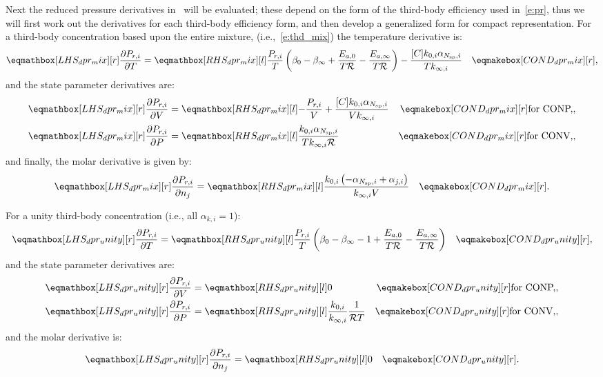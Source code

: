 \documentclass[12pt,number,sort&compress]{elsarticle}
\begin{document}
Next the reduced pressure derivatives in~ will be evaluated; these depend on the form of the third-body efficiency used in~\cref{e:pr}, thus we will first work out the derivatives for each third-body efficiency form, and then develop a generalized form for compact representation.
For a third-body concentration based upon the entire mixture, (i.e.,~\cref{e:thd_mix}) the temperature derivative is:
\begin{align}
 \lhs{dpr_mix}{\frac{\partial P_{r, i} }{\partial T }} &= \rhs{dpr_mix}{\frac{P_{r, i}}{T} \left(\beta_{0} - \beta_{\infty} + \frac{E_{a, 0}}{T \Ru/} - \frac{E_{a, \infty}}{T \Ru/}\right) - \frac{[C] k_{0, i} \alpha_{\ns/,i}}{T k_{\infty, i}}} & \cond{dpr_mix}{,} \label{e:dpr_mix_dt}
\end{align}
and the state parameter derivatives are:
\begin{subequations}
 \label{e:dpr_mix_de}
 \begin{align}
  \lhs{dpr_mix}{\frac{\partial P_{r, i} }{\partial V }} &= \rhs{dpr_mix}{- \frac{P_{r, i}}{V} + \frac{[C] k_{0, i} \alpha_{\ns/,i}}{V k_{\infty, i}}} & \cond{dpr_mix}{\dconp/,} \\
  \lhs{dpr_mix}{\frac{\partial P_{r, i} }{\partial P }} &= \rhs{dpr_mix}{\frac{k_{0, i} \alpha_{\ns/,i}}{T k_{\infty, i} \Ru/}} & \cond{dpr_mix}{\dconv/,}
 \end{align}
\end{subequations}
and finally, the molar derivative is given by:
\begin{align}
 \lhs{dpr_mix}{\frac{\partial P_{r, i} }{\partial n_j }} &= \rhs{dpr_mix}{\frac{k_{0, i} \left(- \alpha_{\ns/,i} + \alpha_{j,i}\right)}{k_{\infty, i} V}} & \cond{dpr_mix}{.} \label{e:dpr_mix_dnj}
\end{align}


For a unity third-body concentration (i.e., all $\alpha_{k,i}=1$):
\begin{align}
 \lhs{dpr_unity}{\frac{\partial P_{r, i} }{\partial T }} &= \rhs{dpr_unity}{\frac{P_{r, i}}{T} \left(\beta_{0} - \beta_{\infty} - 1 + \frac{E_{a, 0}}{T \Ru/} - \frac{E_{a, \infty}}{T \Ru/}\right)} & \cond{dpr_unity}{,} \label{e:dpr_unity_dt}
\end{align}
and the state parameter derivatives are:
\begin{subequations}
 \label{e:dpr_unity_de}
 \begin{align}
  \lhs{dpr_unity}{\frac{\partial P_{r, i} }{\partial V }} &= \rhs{dpr_unity}{0} & \cond{dpr_unity}{\dconp/,}\\
  \lhs{dpr_unity}{\frac{\partial P_{r, i} }{\partial P }} &= \rhs{dpr_unity}{\frac{k_{0, i}}{k_{\infty, i}} \frac{1}{\Ru/ T}} & \cond{dpr_unity}{\dconv/,}
 \end{align}
\end{subequations}
and the molar derivative is:
\begin{align}
 \lhs{dpr_unity}{\frac{\partial P_{r, i} }{\partial n_j }} &= \rhs{dpr_unity}{0} & \cond{dpr_unity}{.} \label{e:dpr_unity_dnj}
\end{align}
\end{document}
